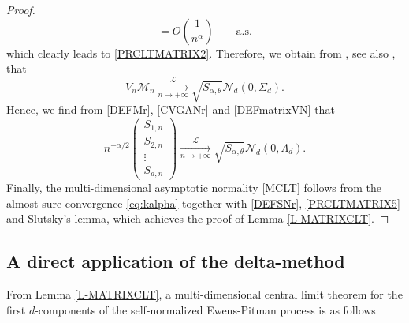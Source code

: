 \documentclass[twoside,12pt]{article}
\newcommand{\cM}{\mathcal{M}}
\newcommand{\cL}{\mathcal{L}}
\newcommand{\cN}{\mathcal{N}}
\begin{document}
\begin{proof}
\begin{equation*}
=O\left( \frac{1}{n^\alpha} \right) \qquad\text{a.s.}
\end{equation*}
which clearly leads to \eqref{PRCLTMATRIX2}. Therefore, we obtain from \citep[Theorem 1]{Tou(91)}, see also
\citep{Tou(94)}, that
\begin{equation}
\label{PRCLTMATRIX4}
V_n \cM_n \underset{n\rightarrow+\infty}{\overset{\cL}{\longrightarrow}} \sqrt{S_{\alpha, \theta}} \cN_d(0, \Sigma_d).
\end{equation}
Hence, we find from \eqref{DEFMr}, \eqref{CVGANr} and \eqref{DEFmatrixVN} that
\begin{equation}
\label{PRCLTMATRIX5}
n^{-\alpha/2} 
\begin{pmatrix}
S_{1,n} \\
S_{2,n}  \\
\vdots\\
S_{d,n} 
\end{pmatrix}
\underset{n\rightarrow+\infty}{\overset{\cL}{\longrightarrow}} \sqrt{S_{\alpha, \theta}} \cN_d(0, \Lambda_d).
\end{equation}
Finally, the multi-dimensional asymptotic normality \eqref{MCLT} follows from 
the almost sure convergence \eqref{eq:kalpha} together with \eqref{DEFSNr}, \eqref{PRCLTMATRIX5} 
and Slutsky’s lemma, which achieves the proof of Lemma \ref{L-MATRIXCLT}.
\end{proof}


\subsection{A direct application of the delta-method} 
\label{Sub-COV}


From Lemma \ref{L-MATRIXCLT}, a multi-dimensional central limit theorem for the first $d$-components of the self-normalized Ewens-Pitman process is as follows
\end{document}
